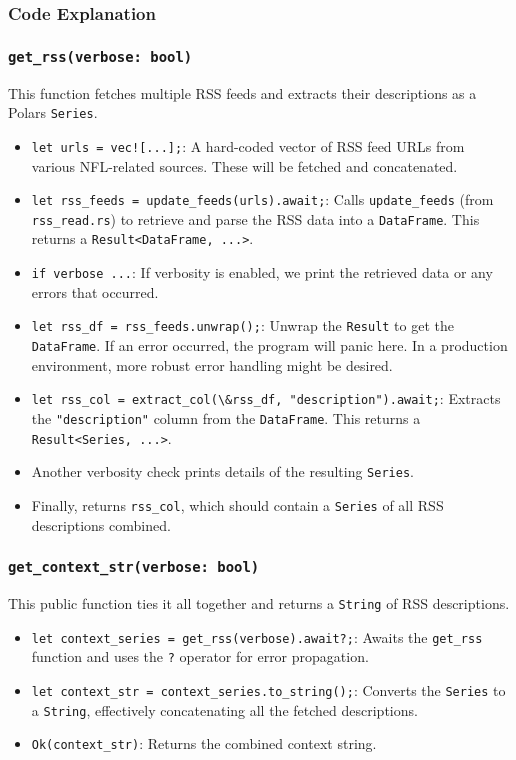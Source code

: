 \subsubsection{Code Explanation}
\subsubsection*{\lstinline{get_rss(verbose: bool)}}
This function fetches multiple RSS feeds and extracts their descriptions as a Polars \lstinline{Series}.

\begin{itemize}
    \item \lstinline{let urls = vec![...];}: A hard-coded vector of RSS feed URLs from various NFL-related sources. These will be fetched and concatenated.
    \item \lstinline{let rss_feeds = update_feeds(urls).await;}: Calls \lstinline{update_feeds} (from \lstinline{rss_read.rs}) to retrieve and parse the RSS data into a \lstinline{DataFrame}. This returns a \lstinline{Result<DataFrame, ...>}.
    \item \lstinline{if verbose ...}: If verbosity is enabled, we print the retrieved data or any errors that occurred.
    \item \lstinline{let rss_df = rss_feeds.unwrap();}: Unwrap the \lstinline{Result} to get the \lstinline{DataFrame}. If an error occurred, the program will panic here. In a production environment, more robust error handling might be desired.
    \item \lstinline{let rss_col = extract_col(\&rss_df, "description").await;}: Extracts the \lstinline{"description"} column from the \lstinline{DataFrame}. This returns a \lstinline{Result<Series, ...>}.
    \item Another verbosity check prints details of the resulting \lstinline{Series}.
    \item Finally, returns \lstinline{rss_col}, which should contain a \lstinline{Series} of all RSS descriptions combined.
\end{itemize}

\subsubsection*{\lstinline{get_context_str(verbose: bool)}}
This public function ties it all together and returns a \lstinline{String} of RSS descriptions.

\begin{itemize}
    \item \lstinline{let context_series = get_rss(verbose).await?;}: Awaits the \lstinline{get_rss} function and uses the \lstinline{?} operator for error propagation.
    \item \lstinline{let context_str = context_series.to_string();}: Converts the \lstinline{Series} to a \lstinline{String}, effectively concatenating all the fetched descriptions.
    \item \lstinline{Ok(context_str)}: Returns the combined context string.
\end{itemize}

